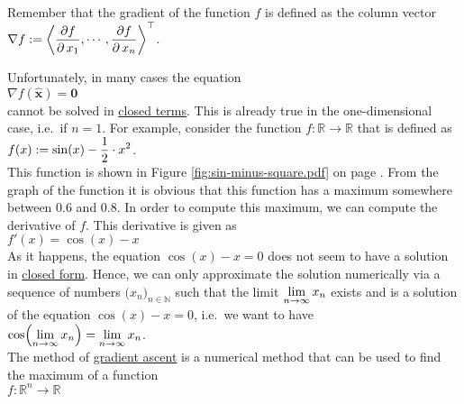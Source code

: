 \noindent
Remember that the gradient of the function $f$ is defined as the column vector
\\[0.2cm]
\hspace*{1.3cm}
$\displaystyle \nabla f :=
    \left\langle \frac{\partial f}{\partial\, x_1}, \cdots, \frac{\partial f}{\partial\, x_n} \right\rangle^\top
$.
\vspace*{0.2cm}

\noindent
Unfortunately, in many cases the equation 
\\[0.2cm]
\hspace*{1.3cm}
$\nabla f(\mathbf{\widehat{x}}) = \mathbf{0}$
\\[0.2cm]
cannot be solved in \href{https://en.wikipedia.org/wiki/Closed-form_expression}{closed terms}.  This is already
true in the one-dimensional case, i.e.~if $n=1$.  For example, consider 
the function $f:\mathbb{R} \rightarrow \mathbb{R}$ that is defined as
\\[0.2cm]
\hspace*{1.3cm}
$\displaystyle f(x) := \sin(x) - \frac{1}{2} \cdot x^2$.
\\[0.2cm]
This function is shown in Figure \ref{fig:sin-minus-square.pdf} on page \pageref{fig:sin-minus-square.pdf}.
From the graph of the function it is obvious that this function has a maximum somewhere between $0.6$ and
$0.8$.  In order to compute this maximum, we can compute the derivative of $f$.   This derivative is given as 
\\[0.2cm]
\hspace*{1.3cm}
$f'(x) = \cos(x) - x$
\\[0.2cm]
As it happens, the equation $\cos(x) - x = 0$ does not seem to have a solution in 
\href{https://en.wikipedia.org/wiki/Closed-form_expression}{closed form}.  Hence, we can only approximate
the solution numerically via a sequence of numbers $(x_n\bigr)_{n\in\mathbb{N}}$ such that the limit
$\displaystyle \lim\limits_{n\rightarrow\infty} x_n$
exists and is a solution of the equation $\cos(x) - x = 0$, i.e.~we want to have
\\[0.2cm]
\hspace*{1.3cm}
$\displaystyle \cos\Bigl(\lim\limits_{n\rightarrow\infty} x_n\Bigr) = \lim\limits_{n\rightarrow\infty} x_n$.
\\[0.2cm]
The method of \href{https://en.wikipedia.org/wiki/Gradient_descent}{gradient ascent} is a numerical
method that can be used to find the maximum of a function 
\\[0.2cm]
\hspace*{1.3cm}
$f: \mathbb{R}^n \rightarrow \mathbb{R}$
